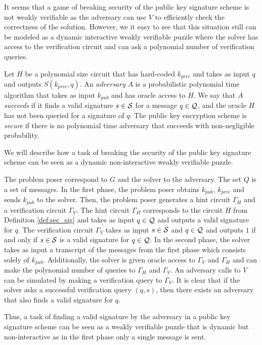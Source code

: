 It seems that a game of breaking security of the public key signature scheme is not weakly verifiable as the adversary can use $V$
to efficiently check the correctness of the solution. However, we it easy to see that this situation still can be modeled as
a dynamic interactive weakly verifiable puzzle where the solver has access to the verification circuit and can ask a polynomial number of verification queries.
%
\begin{definition}
  \label{def:sec_sig}
Let $H$ be a polynomial size circuit that has hard-coded $k_{priv}$ and takes as input $q$ and outputs $S(k_{priv}, q)$.
An \textit{adversary} $A$ is a probabilistic polynomial time algorithm that takes as input $k_{pub}$ and has oracle access to $H$.
We say that $A$ \textit{succeeds} if it finds a valid signature $s \in \mathcal{S}$ for a message $q \in \mathcal{Q}$, and the oracle $H$ has not been queried for a signature of $q$.
The public key encryption scheme is \textit{secure} if there is no polynomial time adversary that succeeds with non-negligible probability.
\end{definition}
%
We will describe how a task of breaking the security of the public key signature scheme can be
seen as a dynamic non-interactive weakly verifiable puzzle.

The problem poser correspond to $G$ and the solver to the adversary. The set $Q$ is a set of messages.
In the first phase, the problem poser obtains $k_{pub}$, $k_{priv}$ and sends $k_{pub}$ to the solver.
Then, the problem poser generates a hint circuit $\Gamma_H$ and a verification circuit $\Gamma_V$.
The hint circuit $\Gamma_H$ corresponds to the circuit $H$ from Definition \ref{def:sec_sig} and takes as input $q \in \mathcal{Q}$ and outputs a valid signature for $q$.
The verification circuit $\Gamma_V$ takes as input $s \in \mathcal{S}$ and $q \in \mathcal{Q}$ and outputs $1$ if and only if $s \in \mathcal{S}$ is a valid signature for $q \in \mathcal{Q}$.
In the second phase, the solver takes as input a transcript of the messages from the first phase which consists solely of $k_{pub}$.
Additionally, the solver is given oracle access to $\Gamma_V$ and $\Gamma_H$ and can make the polynomial number of queries to $\Gamma_H$ and $\Gamma_V$.
An adversary calls to $V$ can be simulated by making a verification query to $\Gamma_V$.
It is clear that if the solver asks a successful verification query $(q,s)$,
then there exists an adversary that also finds a valid signature for $q$.

Thus, a task of finding a valid signature by the adversary in a public key signature scheme can be seen as a weakly verifiable puzzle that
is dynamic but non-interactive as in the first phase only a single message is sent.

